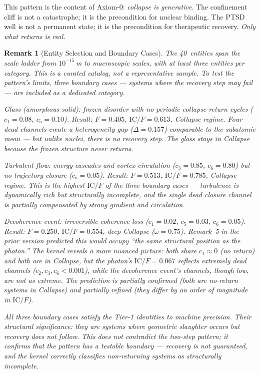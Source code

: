 \documentclass[
  aps,
  prd,
  twocolumn,
  superscriptaddress,
  nofootinbib,
  floatfix
]{revtex4-2}
\newtheorem{remark}{Remark}
\newcommand{\IC}{\mathrm{IC}}
\begin{document}
This pattern is the content of Axiom-0: \emph{collapse is
generative}.  The confinement cliff is not a catastrophe;
it is the precondition for nuclear binding.  The PTSD well
is not a permanent state; it is the precondition for
therapeutic recovery.  \emph{Only what returns is real.}

\begin{remark}[Entity Selection and Boundary Cases]
\label{rem:selection}
The 40~entities span the scale ladder from $10^{-15}$\,m to
macroscopic scales, with at least three entities per
category.  This is a \emph{curated catalog}, not a
representative sample.  To test the pattern's limits, three
boundary cases --- systems where the recovery step may fail
--- are included as a dedicated category.

\emph{Glass (amorphous solid)}: frozen disorder with no
periodic collapse-return cycles ($c_1 = 0.08$, $c_5 = 0.10$).
Result: $F = 0.405$, $\IC/F = 0.613$, Collapse regime.
Four dead channels create a heterogeneity gap ($\Delta =
0.157$) comparable to the subatomic mean --- but unlike
nuclei, there is no recovery step.  The glass \emph{stays}
in Collapse because the frozen structure never returns.

\emph{Turbulent flow}: energy cascades and vortex
circulation ($c_3 = 0.85$, $c_6 = 0.80$) but no trajectory
closure ($c_5 = 0.05$).  Result: $F = 0.513$, $\IC/F =
0.785$, Collapse regime.  This is the highest $\IC/F$ of the
three boundary cases --- turbulence is dynamically rich but
structurally incomplete, and the single dead closure channel
is partially compensated by strong gradient and circulation.

\emph{Decoherence event}: irreversible coherence loss
($c_1 = 0.02$, $c_5 = 0.03$, $c_6 = 0.05$).  Result:
$F = 0.250$, $\IC/F = 0.554$, deep Collapse ($\omega =
0.75$).  Remark~5 in the prior version predicted this would
occupy ``the same structural position as the photon.''  The
kernel reveals a more nuanced picture: both share $c_1
\approx 0$ (no return) and both are in Collapse, but the
photon's $\IC/F = 0.067$ reflects \emph{extremely} dead
channels ($c_2, c_3, c_6 < 0.001$), while the decoherence
event's channels, though low, are not as extreme.  The
prediction is partially confirmed (both are
no-return systems in Collapse) and partially refined (they
differ by an order of magnitude in $\IC/F$).

All three boundary cases satisfy the Tier-1 identities
to machine precision.  Their structural significance: they
are systems where geometric slaughter occurs but recovery
\emph{does not follow}.  This does not contradict the
two-step pattern; it confirms that the pattern has a
testable boundary --- recovery is not guaranteed, and the
kernel correctly classifies non-returning systems as
structurally incomplete.
\end{remark}
\end{document}
